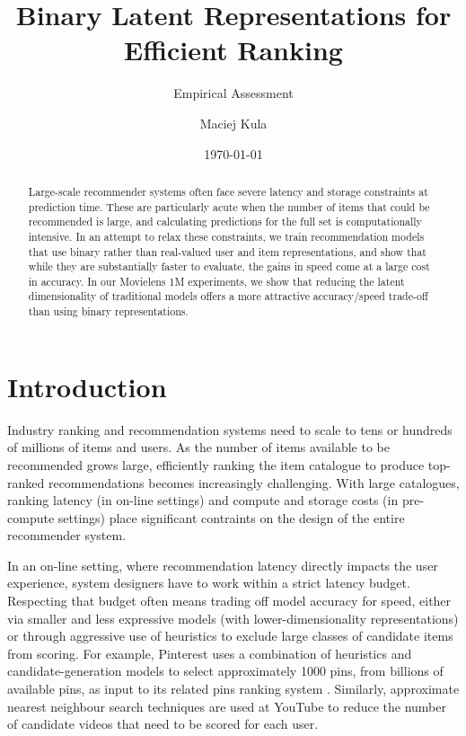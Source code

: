 \documentclass[sigchi]{acmart}
\begin{document}
\title{Binary Latent Representations for Efficient Ranking}
\subtitle{Empirical Assessment}
\author{Maciej Kula}
\date{\today}
\acmConference[]{}{}{}


\begin{abstract}
Large-scale recommender systems often face severe latency and storage constraints at prediction time. These are particularly acute when the number of items that could be recommended is large, and calculating predictions for the full set is computationally intensive. In an attempt to relax these constraints, we train recommendation models that use binary rather than real-valued user and item representations, and show that while they are substantially faster to evaluate, the gains in speed come at a large cost in accuracy. In our Movielens 1M experiments, we show that reducing the latent dimensionality of traditional models offers a more attractive accuracy/speed trade-off than using binary representations.
\end{abstract}

\maketitle

\section{Introduction}
Industry ranking and recommendation systems need to scale to tens or hundreds of millions of items and users. As the number of items available to be recommended grows large, efficiently ranking the item catalogue to produce top-ranked recommendations becomes increasingly challenging. With large catalogues, ranking latency (in on-line settings) and compute and storage costs (in pre-compute settings) place significant contraints on the design of the entire recommender system.

In an on-line setting, where recommendation latency directly impacts the user experience, system designers have to work within a strict latency budget. Respecting that budget often means trading off model accuracy for speed, either via smaller and less expressive models (with lower-dimensionality representations) or through aggressive use of heuristics to exclude large classes of candidate items from scoring. For example, Pinterest uses a combination of heuristics and candidate-generation models to select approximately 1000 pins, from billions of available pins, as input to its related pins ranking system \citep{liu2017related}. Similarly, approximate nearest neighbour search techniques are used at YouTube \citep{covington2016deep} to reduce the number of candidate videos that need to be scored for each user.
\end{document}
